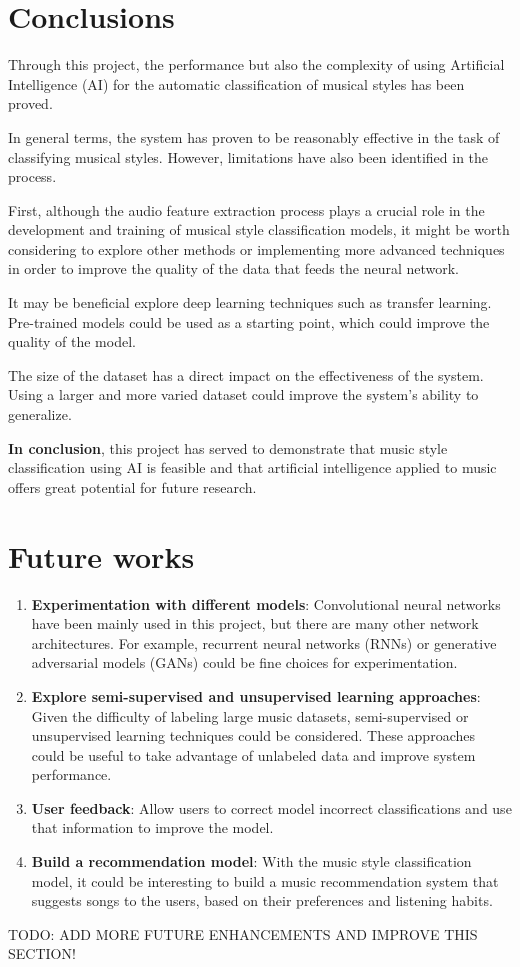 
\section{Conclusions}
Through this project, the performance but also the complexity of using Artificial Intelligence (AI) for the automatic classification of musical styles has been proved.

In general terms, the system has proven to be reasonably effective in the task of classifying musical styles. However, limitations have also been identified in the process.

First, although the audio feature extraction process plays a crucial role in the development and training of musical style classification models, it might be worth considering to explore other methods or implementing more advanced techniques in order to improve the quality of the data that feeds the neural network.

It may be beneficial explore deep learning techniques such as transfer learning. Pre-trained models could be used as a starting point, which could improve the quality of the model.

The size of the dataset has a direct impact on the effectiveness of the system. Using a larger and more varied dataset could improve the system's ability to generalize.

\textbf{In conclusion}, this project has served to demonstrate that music style classification using AI is feasible and that artificial intelligence applied to music offers great potential for future research.

\section{Future works}

\begin{enumerate}
\item \textbf{Experimentation with different models}: Convolutional neural networks have been mainly used in this project, but there are many other network architectures. For example, recurrent neural networks (RNNs) or generative adversarial models (GANs) could be fine choices for experimentation.

\item \textbf{Explore semi-supervised and unsupervised learning approaches}: Given the difficulty of labeling large music datasets, semi-supervised or unsupervised learning techniques could be considered. These approaches could be useful to take advantage of unlabeled data and improve system performance.

\item \textbf{User feedback}: Allow users to correct model incorrect classifications and use that information to improve the model.

\item \textbf{Build a recommendation model}: With the music style classification model, it could be interesting to build a music recommendation system that suggests songs to the users, based on their preferences and listening habits.
\end{enumerate}

TODO: ADD MORE FUTURE ENHANCEMENTS AND IMPROVE THIS SECTION!